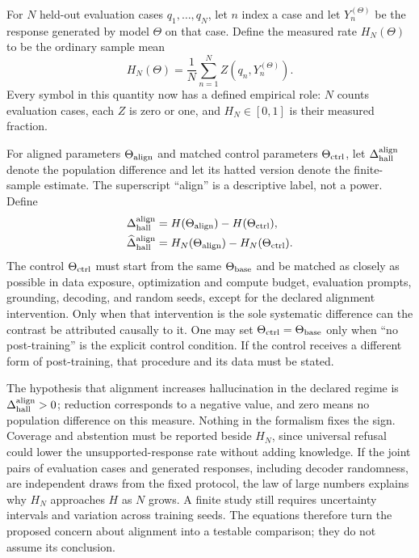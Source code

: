 \documentclass[
  aps,
  reprint,
  superscriptaddress,
  floatfix,
  nofootinbib,
  longbibliography
]{revtex4-2}
\begin{document}
For $N$ held-out evaluation cases $q_1,\ldots,q_N$, let $n$ index a case and
let $Y_n^{(\Theta)}$ be the response generated by model $\Theta$ on that case.
Define the measured rate $H_N(\Theta)$ to be the ordinary sample mean
\begin{equation}
\label{eq:app-hallucination-rate}
H_N(\Theta)=\frac{1}{N}\sum_{n=1}^{N}
Z(q_n,Y_n^{(\Theta)}).
\end{equation}
Every symbol in this quantity now has a defined empirical role: $N$ counts evaluation
cases, each $Z$ is zero or one, and $H_N\in[0,1]$ is their measured fraction.

For aligned parameters $\Theta_{\rm align}$ and matched control parameters
$\Theta_{\rm ctrl}$, let $\Delta_{\rm hall}^{\rm align}$ denote the population
difference and let its hatted version denote the finite-sample estimate.  The
superscript ``align'' is a descriptive label, not a power.  Define
\begin{equation}
\label{eq:app-hallucination-test}
\begin{aligned}
\Delta_{\rm hall}^{\rm align}
&=H(\Theta_{\rm align})-H(\Theta_{\rm ctrl}),\\
\widehat{\Delta}_{\rm hall}^{\rm align}
&=H_N(\Theta_{\rm align})-H_N(\Theta_{\rm ctrl}).
\end{aligned}
\end{equation}
The control $\Theta_{\rm ctrl}$ must start from the same $\Theta_{\rm base}$
and be matched as closely as possible in data exposure, optimization and
compute budget, evaluation prompts, grounding, decoding, and random seeds,
except for the declared alignment intervention.  Only when that intervention is
the sole systematic difference can the contrast be attributed causally to it.
One may set
$\Theta_{\rm ctrl}=\Theta_{\rm base}$ only when ``no post-training'' is the
explicit control condition.  If the control receives a different form of
post-training, that procedure and its data must be stated.

The hypothesis that alignment increases hallucination in the declared regime
is $\Delta_{\rm hall}^{\rm align}>0$; reduction corresponds to a negative
value, and zero means no population difference on this measure.  Nothing in
the formalism fixes the sign.  Coverage and abstention must be reported beside
$H_N$, since universal refusal could lower the unsupported-response rate
without adding knowledge.  If the joint pairs of evaluation cases and generated
responses, including decoder randomness, are independent draws from the fixed
protocol, the law of large numbers explains why $H_N$ approaches $H$ as $N$
grows.  A finite study still requires uncertainty intervals and
variation across training seeds.  The equations therefore turn the proposed
concern about alignment into a testable comparison; they do not assume its
conclusion.
\end{document}
